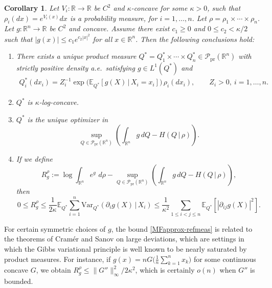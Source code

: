\documentclass[11pt,reqno]{amsart}
\numberwithin{equation}{section}
\newtheorem{corollary}[theorem]{Corollary}
\theoremstyle{definition}
\def\E{{\mathbb E}}
\def\R{{\mathbb R}}
\def\P{{\mathcal P}}
\def\Var{{\mathrm{Var}}}
\def\Pprod{\P_{\mathrm{pr}}}
\begin{document}
\begin{corollary} \label{co:refmeas}
	Let $V_i : \R \to \R$ be $C^2$ and $\kappa$-concave  for some $\kappa > 0$, such that $\rho_i(dx)=e^{V_i(x)}dx$ is a probability measure, for $i=1,\ldots,n$. Let $\rho = \rho_1 \times \cdots \times \rho_n$.
	Let $g: \R^n \to \R$ be  $C^2$ and concave. Assume there exist $ c_1\ge 0 $ and $0 \le c_2  <  \kappa /2$ such that $ |g(x)| \le c_1 e^{c_2 |x|^2} $ for all $ x \in \R^n $.  Then the following conclusions hold: 
	\begin{enumerate}[(1)]
		\item There exists a unique product measure $Q^* = Q^*_1 \times \cdots \times Q^*_n \in \Pprod(\R^n)$  with strictly positive density a.e.\ satisfying  $g \in L^1(Q^*)$ and 
		\begin{align}
			Q^*_i(dx_i) = Z_i^{-1} \exp \big(\E_{Q^*}[g(X)\,|\,X_i=x_i]\big)\,\rho_i(dx_i), \qquad  Z_i > 0, \ i=1,\ldots,n.  \label{fixedpoint-refmeas}
		\end{align}
		
		
		
		\item $Q^*$ is $\kappa$-log-concave. \label{Q^*-log-concave-refmeas}
		
		
		\item $Q^*$ is the unique optimizer in
		\begin{equation}
			\sup_{Q \in \Pprod(\R^n)} \left( \int_{\R^n} g\,dQ- H(Q\,|\,\rho )\right).  \label{MFopt-refmeas}
		\end{equation}
		\item 
		If we define
		\begin{equation*}
			R^\rho_g  := \log \int_{\R^n}  e^g\,\,d\rho -  \sup_{Q \in \Pprod(\R^n) } \left( \int_{\R^n} g\,dQ - H(Q\,|\,\rho )\right),
		\end{equation*}
		then
		\begin{equation}
			0 \le R^\rho_g \le  \frac{1}{2\kappa} \E_{Q^*}\sum_{i=1}^n  \Var_{Q^*}(\partial_i g(X)\,|\,X_i)  \le \frac{1}{\kappa^2}\sum_{1\le i<j\le n} \E_{Q^*}[|\partial_{ij}g(X)|^2]. \label{MFapprox-refmeas}
		\end{equation}
	\end{enumerate}
\end{corollary}



 For certain symmetric choices of $g$, the bound \eqref{MFapprox-refmeas} is related to the theorems of Cram\'er and Sanov on large deviations, which are settings in which the Gibbs variational principle is well known to be nearly saturated by product measures. 
	For instance, if $g(x) = nG\big(\frac{1}{n}\sum_{k=1}^n x_k \big)$ for some continuous concave $G$, we obtain $R^\rho_g \le \|G''\|_\infty^2/2\kappa^2$, which is certainly $o(n)$ when $G''$ is bounded.
\end{document}
